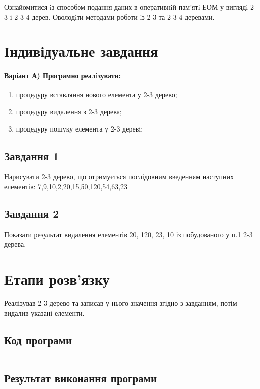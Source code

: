 \documentclass[a4paper, 12pt, oneside]{extarticle}
\begin{document}
\Margins


Ознайомитися iз способом подання даних в оперативнiй пам’ятi ЕОМ у
виглядi 2-3 і 2-3-4 дерев. Оволодiти методами роботи iз 2-3 та 2-3-4 деревами.
\section*{Індивідуальне завдання}

\paragraph{Варіант А) Програмно реалiзувати:}
\begin{enumerate}
\item процедуру вставляння нового елемента у 2-3 дерево;
\item процедуру видалення з 2-3 дерева;
\item процедуру пошуку елемента у 2-3 деревi;
\end{enumerate}

\subsection*{Завдання 1}

Нарисувати 2-3 дерево, що отримується послідовним введенням
наступних елементів: 7,9,10,2,20,15,50,120,54,63,23

\subsection*{Завдання 2}

Показати результат видалення елементів 20, 120, 23, 10 із
побудованого у п.1 2-3 дерева.

\section*{Етапи розв'язку}

Реалізував 2-3 дерево та записав у нього значення згідно з завданням,
потім видалив указані елементи.

\subsection*{Код програми}

\inputminted{c++}{code.cpp}

\subsection*{Результат виконання програми}
\inputminted{text}{out}
\end{document}

